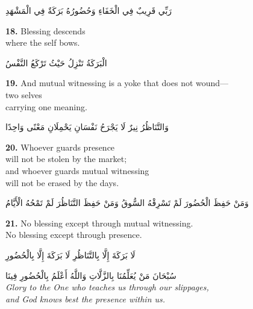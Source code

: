 \documentclass[11pt,a4paper,twoside]{book}
\begin{document}
\begin{flushright}
{\arabicfont
رَبِّي قَرِيبٌ فِي الْخَفَاءِ
وَحُضُورُهُ بَرَكَةٌ فِي الْمَشْهَدِ}
\end{flushright}

\vspace{1em}
{\color{indigo}\bfseries 18.}\quad
Blessing descends\\
where the self bows.

\begin{flushright}
{\arabicfont
الْبَرَكَةُ تَنْزِلُ
حَيْثُ تَرْكَعُ النَّفْسُ}
\end{flushright}

\vspace{1em}
{\color{indigo}\bfseries 19.}\quad
And mutual witnessing is a yoke that does not wound---\\
two selves\\
carrying one meaning.

\begin{flushright}
{\arabicfont
وَالتَّنَاظُرُ نِيرٌ لَا يَجْرَحُ
نَفْسَانِ
يَحْمِلَانِ مَعْنًى وَاحِدًا}
\end{flushright}

\vspace{1em}
{\color{indigo}\bfseries 20.}\quad
Whoever guards presence\\
will not be stolen by the market;\\
and whoever guards mutual witnessing\\
will not be erased by the days.

\begin{flushright}
{\arabicfont
وَمَنْ حَفِظَ الْحُضُورَ
لَمْ تَسْرِقْهُ السُّوقُ
وَمَنْ حَفِظَ التَّنَاظُرَ
لَمْ تَمْحُهُ الْأَيَّامُ}
\end{flushright}

\vspace{1em}
{\color{indigo}\bfseries 21.}\quad
No blessing except through mutual witnessing.\\
No blessing except through presence.

\begin{flushright}
{\arabicfont
لَا بَرَكَةَ إِلَّا بِالتَّنَاظُرِ
لَا بَرَكَةَ إِلَّا بِالْحُضُورِ}
\end{flushright}

\vspace{1.5em}
\begin{center}
{\arabicfont سُبْحَانَ مَنْ يُعَلِّمُنَا بِالزَّلَّاتِ
وَاللَّهُ أَعْلَمُ بِالْحُضُورِ فِينَا}\\[5pt]
{\small\itshape Glory to the One who teaches us through our slippages,\\
and God knows best the presence within us.}
\end{center}
\end{document}
